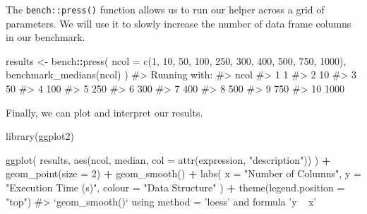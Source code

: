\documentclass[
]{krantz}
\makeatletter
\newenvironment{Shaded}{\begin{snugshade}}{\end{snugshade}}
\newcommand{\CommentTok}[1]{\textcolor[rgb]{0.56,0.35,0.01}{\textit{#1}}}
\newcommand{\DataTypeTok}[1]{\textcolor[rgb]{0.13,0.29,0.53}{#1}}
\newcommand{\DecValTok}[1]{\textcolor[rgb]{0.00,0.00,0.81}{#1}}
\newcommand{\KeywordTok}[1]{\textcolor[rgb]{0.13,0.29,0.53}{\textbf{#1}}}
\newcommand{\NormalTok}[1]{#1}
\newcommand{\OperatorTok}[1]{\textcolor[rgb]{0.81,0.36,0.00}{\textbf{#1}}}
\newcommand{\StringTok}[1]{\textcolor[rgb]{0.31,0.60,0.02}{#1}}
\newenvironment{kframe}{%
\medskip{}
\setlength{\fboxsep}{.8em}
 \def\at@end@of@kframe{}%
 \ifinner\ifhmode%
  \def\at@end@of@kframe{\end{minipage}}%
  \begin{minipage}{\columnwidth}%
 \fi\fi%
 \def\FrameCommand##1{\hskip\@totalleftmargin \hskip-\fboxsep
 \colorbox{shadecolor}{##1}\hskip-\fboxsep
     \hskip-\linewidth \hskip-\@totalleftmargin \hskip\columnwidth}%
 \MakeFramed {\advance\hsize-\width
   \@totalleftmargin\z@ \linewidth\hsize
   \@setminipage}}%
 {\par\unskip\endMakeFramed%
 \at@end@of@kframe}
\renewenvironment{Shaded}{\begin{kframe}}{\end{kframe}}
\renewcommand{\KeywordTok} [1]{\textcolor[rgb]{0.00,0.44,0.13}{{#1}}}
\renewcommand{\DataTypeTok}[1]{\textcolor[rgb]{0.56,0.13,0.00}{{#1}}}
\renewcommand{\DecValTok}  [1]{\textcolor[rgb]{0.25,0.63,0.44}{{#1}}}
\renewcommand{\StringTok}  [1]{\textcolor[rgb]{0.25,0.44,0.63}{{#1}}}
\renewcommand{\CommentTok} [1]{\textcolor[rgb]{0.38,0.63,0.69}{{#1}}}
\renewcommand{\NormalTok}  [1]{{#1}}
\makeatother
\begin{document}
The \texttt{bench::press()} function allows us to run our helper across a grid of parameters. We will use it to slowly increase the number of data frame columns in our benchmark.

\begin{Shaded}
\begin{Highlighting}[]
\NormalTok{results <-}\StringTok{ }\NormalTok{bench}\OperatorTok{::}\KeywordTok{press}\NormalTok{(}
  \DataTypeTok{ncol =} \KeywordTok{c}\NormalTok{(}\DecValTok{1}\NormalTok{, }\DecValTok{10}\NormalTok{, }\DecValTok{50}\NormalTok{, }\DecValTok{100}\NormalTok{, }\DecValTok{250}\NormalTok{, }\DecValTok{300}\NormalTok{, }\DecValTok{400}\NormalTok{, }\DecValTok{500}\NormalTok{, }\DecValTok{750}\NormalTok{, }\DecValTok{1000}\NormalTok{),}
  \KeywordTok{benchmark_medians}\NormalTok{(ncol)}
\NormalTok{)}
\CommentTok{#> Running with:}
\CommentTok{#>     ncol}
\CommentTok{#>  1     1}
\CommentTok{#>  2    10}
\CommentTok{#>  3    50}
\CommentTok{#>  4   100}
\CommentTok{#>  5   250}
\CommentTok{#>  6   300}
\CommentTok{#>  7   400}
\CommentTok{#>  8   500}
\CommentTok{#>  9   750}
\CommentTok{#> 10  1000}
\end{Highlighting}
\end{Shaded}

Finally, we can plot and interpret our results.

\begin{Shaded}
\begin{Highlighting}[]
\KeywordTok{library}\NormalTok{(ggplot2)}

\KeywordTok{ggplot}\NormalTok{(}
\NormalTok{  results,}
  \KeywordTok{aes}\NormalTok{(ncol, median, }\DataTypeTok{col =} \KeywordTok{attr}\NormalTok{(expression, }\StringTok{"description"}\NormalTok{))}
\NormalTok{) }\OperatorTok{+}
\StringTok{  }\KeywordTok{geom_point}\NormalTok{(}\DataTypeTok{size =} \DecValTok{2}\NormalTok{) }\OperatorTok{+}
\StringTok{  }\KeywordTok{geom_smooth}\NormalTok{() }\OperatorTok{+}
\StringTok{  }\KeywordTok{labs}\NormalTok{(}
    \DataTypeTok{x =} \StringTok{"Number of Columns"}\NormalTok{,}
    \DataTypeTok{y =} \StringTok{"Execution Time (s)"}\NormalTok{,}
    \DataTypeTok{colour =} \StringTok{"Data Structure"}
\NormalTok{  ) }\OperatorTok{+}
\StringTok{  }\KeywordTok{theme}\NormalTok{(}\DataTypeTok{legend.position =} \StringTok{"top"}\NormalTok{)}
\CommentTok{#> `geom_smooth()` using method = 'loess' and formula 'y ~ x'}
\end{Highlighting}
\end{Shaded}
\end{document}
